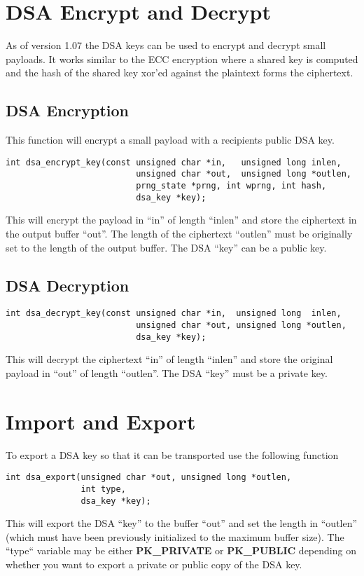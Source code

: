 \documentclass[a4paper]{book}
\begin{document}
\section{DSA Encrypt and Decrypt}
As of version 1.07 the DSA keys can be used to encrypt and decrypt small payloads.  It works similar to the ECC encryption where
a shared key is computed and the hash of the shared key xor'ed against the plaintext forms the ciphertext.

\subsection{DSA Encryption}
This function will encrypt a small payload with a recipients public DSA key.

\begin{verbatim}
int dsa_encrypt_key(const unsigned char *in,   unsigned long inlen,
                          unsigned char *out,  unsigned long *outlen, 
                          prng_state *prng, int wprng, int hash, 
                          dsa_key *key);
\end{verbatim}

This will encrypt the payload in ``in'' of length ``inlen'' and store the ciphertext in the output buffer ``out''.  The
length of the ciphertext ``outlen'' must be originally set to the length of the output buffer.  The DSA ``key'' can be 
a public key.

\subsection{DSA Decryption}

\begin{verbatim}                      
int dsa_decrypt_key(const unsigned char *in,  unsigned long  inlen,
                          unsigned char *out, unsigned long *outlen, 
                          dsa_key *key);
\end{verbatim}
This will decrypt the ciphertext ``in'' of length ``inlen'' and store the original payload in ``out'' of length ``outlen''.  The DSA ``key'' must be a private key.

\section{Import and Export}

To export a DSA key so that it can be transported use the following function
\begin{verbatim}
int dsa_export(unsigned char *out, unsigned long *outlen, 
               int type, 
               dsa_key *key);
\end{verbatim}
This will export the DSA ``key'' to the buffer ``out'' and set the length in ``outlen'' (which must have been previously
initialized to the maximum buffer size).  The ``type`` variable may be either \textbf{PK\_PRIVATE} or \textbf{PK\_PUBLIC}
depending on whether you want to export a private or public copy of the DSA key.
\end{document}
